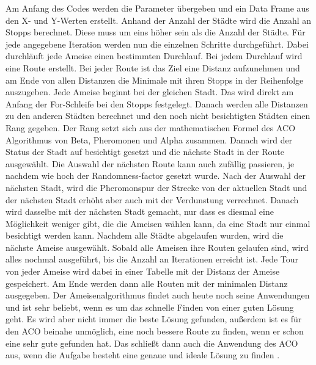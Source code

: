 Am Anfang des Codes werden die Parameter übergeben und ein Data Frame aus den X- und Y-Werten erstellt. Anhand der Anzahl der Städte wird die Anzahl an Stopps berechnet. Diese muss um eins höher sein als die Anzahl der Städte.
\newline
Für jede angegebene Iteration werden nun die einzelnen Schritte durchgeführt. Dabei durchläuft jede Ameise einen bestimmten Durchlauf. Bei jedem Durchlauf wird eine Route erstellt. Bei jeder Route ist das Ziel eine Distanz aufzunehmen und am Ende von allen Distanzen die Minimale mit ihren Stopps in der Reihenfolge auszugeben.
\newline
Jede Ameise beginnt bei der gleichen Stadt. Das wird direkt am Anfang der For-Schleife bei den Stopps festgelegt. Danach werden alle Distanzen zu den anderen Städten berechnet und den noch nicht besichtigten Städten einen Rang gegeben. Der Rang setzt sich aus der mathematischen Formel des ACO Algorithmus von Beta, Pheromonen und Alpha zusammen. Danach wird der Status der Stadt auf besichtigt gesetzt und die nächste Stadt in der Route ausgewählt. Die Auswahl der nächsten Route kann auch zufällig passieren, je nachdem wie hoch der Randomness-factor gesetzt wurde. Nach der Auswahl der nächsten Stadt, wird die Pheromonspur der Strecke von der aktuellen Stadt und der nächsten Stadt erhöht aber auch mit der Verdunstung verrechnet. Danach wird dasselbe mit der nächsten Stadt gemacht, nur dass es diesmal eine Möglichkeit weniger gibt, die die Ameisen wählen kann, da eine Stadt nur einmal besichtigt werden kann. 
\newline
Nachdem alle Städte abgelaufen wurden, wird die nächste Ameise ausgewählt. Sobald alle Ameisen ihre Routen gelaufen sind, wird alles nochmal ausgeführt, bis die Anzahl an Iterationen erreicht ist.
\newline
Jede Tour von jeder Ameise wird dabei in einer Tabelle mit der Distanz der Ameise gespeichert. Am Ende werden dann alle Routen mit der minimalen Distanz ausgegeben. 
\newline
\newline
Der Ameisenalgorithmus findet auch heute noch seine Anwendungen und ist sehr beliebt, wenn es um das schnelle Finden von einer guten Lösung geht. Es wird aber nicht immer die beste Lösung gefunden, außerdem ist es für den ACO beinahe unmöglich, eine noch bessere Route zu finden, wenn er schon eine sehr gute gefunden hat. Das schließt dann auch die Anwendung des ACO aus, wenn die Aufgabe besteht eine genaue und ideale Lösung zu finden \citep{LogistikInfonodate}.
\newline
